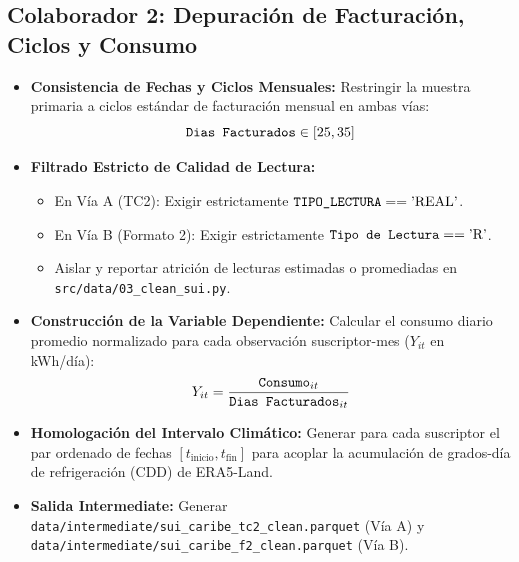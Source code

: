 \documentclass[11pt,a4paper]{article}
\begin{document}
\subsection{Colaborador 2: Depuración de Facturación, Ciclos y Consumo}
\begin{itemize}
    \item \textbf{Consistencia de Fechas y Ciclos Mensuales:} 
    Restringir la muestra primaria a ciclos estándar de facturación mensual en ambas vías:
    $$\text{\texttt{Dias Facturados}} \in [25, 35]$$
    \item \textbf{Filtrado Estricto de Calidad de Lectura:}
    \begin{itemize}
        \item En Vía A (TC2): Exigir estrictamente $\text{\texttt{TIPO\_LECTURA}} == \text{'REAL'}$.
        \item En Vía B (Formato 2): Exigir estrictamente $\text{\texttt{Tipo de Lectura}} == \text{'R'}$.
        \item Aislar y reportar atrición de lecturas estimadas o promediadas en \texttt{src/data/03\_clean\_sui.py}.
    \end{itemize}
    \item \textbf{Construcción de la Variable Dependiente:} Calcular el consumo diario promedio normalizado para cada observación suscriptor-mes ($Y_{it}$ en kWh/día):
    $$Y_{it} = \frac{\text{\texttt{Consumo}}_{it}}{\text{\texttt{Dias Facturados}}_{it}}$$
    \item \textbf{Homologación del Intervalo Climático:} Generar para cada suscriptor el par ordenado de fechas $[t_{\text{inicio}}, t_{\text{fin}}]$ para acoplar la acumulación de grados-día de refrigeración (CDD) de ERA5-Land.
    \item \textbf{Salida Intermediate:} Generar \texttt{data/intermediate/sui\_caribe\_tc2\_clean.parquet} (Vía A) y \texttt{data/intermediate/sui\_caribe\_f2\_clean.parquet} (Vía B).
\end{itemize}
\end{document}

